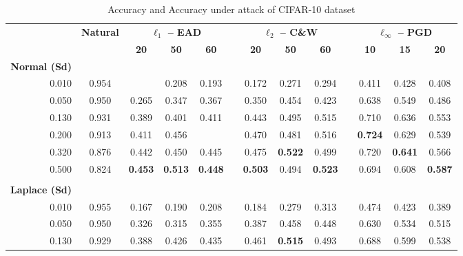 \begin{table}[htb]
  \centering
  \tiny
  \caption{Accuracy and Accuracy under attack of CIFAR-10 dataset}
  \label{table:ap2-cifar10-appendix}%
    \begin{tabular}{rcccccccccccc}
    \toprule
          & \multirow{2}[3]{*}{\textbf{Natural}} & \multicolumn{3}{c}{\textbf{$\ell_1$ -- EAD}} &       & \multicolumn{3}{c}{\textbf{$\ell_2$ -- C\&W}} &       & \multicolumn{3}{c}{\textbf{$\ell_\infty$ -- PGD}} \\
\cmidrule{3-5}\cmidrule{7-9}\cmidrule{11-13}          &       & \textbf{20} & \textbf{50} & \textbf{60} &       & \textbf{20} & \textbf{50} & \textbf{60} &       & \textbf{10} & \textbf{15} & \textbf{20} \\
    \textbf{Normal (Sd)} &       &       &       &       &       &       &       &       &       &       &       &  \\
    \midrule
    0.010 & 0.954 &       & 0.208 & 0.193 &       & 0.172 & 0.271 & 0.294 &       & 0.411 & 0.428 & 0.408 \\
    0.050 & 0.950 & 0.265 & 0.347 & 0.367 &       & 0.350 & 0.454 & 0.423 &       & 0.638 & 0.549 & 0.486 \\
    0.130 & 0.931 & 0.389 & 0.401 & 0.411 &       & 0.443 & 0.495 & 0.515 &       & 0.710 & 0.636 & 0.553 \\
    0.200 & 0.913 & 0.411 & 0.456 &       &       & 0.470 & 0.481 & 0.516 &       & \textbf{0.724} & 0.629 & 0.539 \\
    0.320 & 0.876 & 0.442 & 0.450 & 0.445 &       & 0.475 & \textbf{0.522} & 0.499 &       & 0.720 & \textbf{0.641} & 0.566 \\
    0.500 & 0.824 & \textbf{0.453} & \textbf{0.513} & \textbf{0.448} &       & \textbf{0.503} & 0.494 & \textbf{0.523} &       & 0.694 & 0.608 & \textbf{0.587} \\
          &       &       &       &       &       &       &       &       &       &       &       &  \\
    \textbf{Laplace (Sd)} &       &       &       &       &       &       &       &       &       &       &       &  \\
    \midrule
    0.010 & 0.955 & 0.167 & 0.190 & 0.208 &       & 0.184 & 0.279 & 0.313 &       & 0.474 & 0.423 & 0.389 \\
    0.050 & 0.950 & 0.326 & 0.315 & 0.355 &       & 0.387 & 0.458 & 0.448 &       & 0.630 & 0.534 & 0.515 \\
    0.130 & 0.929 & 0.388 & 0.426 & 0.435 &       & 0.461 & \textbf{0.515} & 0.493 &       & 0.688 & 0.599 & 0.538 \\

\end{tabular}
\end{table}
